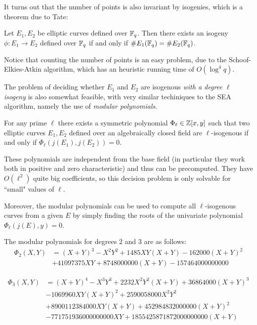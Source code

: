 It turns out that the number of points is also invariant by isogenies, which is a theorem due to Tate:
\begin{theorem}
    Let $E_1,E_2$ be elliptic curves defined over $\mathbb{F}_q$. Then there exists an isogeny $\phi: E_1\to E_2$ defined over $\mathbb{F}_q$ if and only if $\# E_1(\mathbb{F}_q)=\# E_2(\mathbb{F}_q)$.
\end{theorem}

Notice that counting the number of points is an easy problem, due to the Schoof-Elkies-Atkin algorithm, which has an heuristic running time of $O(\log^4 q)$.

The problem of deciding whether $E_1$ and $E_2$ are isogenous \emph{with a degree $\ell$ isogeny} is also somewhat feasible, with very similar techiniques to the SEA algorithm, namely the use of \emph{modular polynomials}.

\begin{theorem}
    For any prime $\ell$ there exists a symmetric polynomial $\Phi_\ell\in\mathbb{Z}[x,y]$ such that two elliptic curves $E_1,E_2$ defined over an algebraically closed field are $\ell$-isogenous if and only if $\Phi_\ell(j(E_1),j(E_2))=0$.
\end{theorem}

These polynomials are independent from the base field (in particular they work both in positive and zero characteristic) and thus can be precomputed. They have $O(\ell^2)$ quite big coefficients, so this decision problem is only solvable for ``small" values of $\ell$.

Moreover, the modular polynomials can be used to compute all $\ell$-isogenous curves from a given $E$ by simply finding the roots of the univariate polynomial $\Phi_\ell(j(E),y)=0$.

\begin{example}
    The modular polynomials for degrees $2$ and $3$ are as follows:
    \begin{align*}
    \Phi_2(X,Y) &= (X+Y)^3-X^2Y^2+1485XY(X+Y)-162000(X+Y)^2 \\
    & + 41097375 XY + 8748000000(X+Y) - 157464000000000
    \end{align*}
    
    \begin{align*}
    \Phi_3(X,Y) &= (X+Y)^4 - X^3Y^3 + 2232X^2Y^2(X+Y) + 36864000(X+Y)^3\\
    & - 1069960XY(X+Y)^2 + 2590058000X^2Y^2\\
    & + 8900112384000XY(X+Y) + 452984832000000(X+Y)^2\\
    & - 771751936000000000XY + 1855425871872000000000(X+Y)
    \end{align*}
\end{example}

